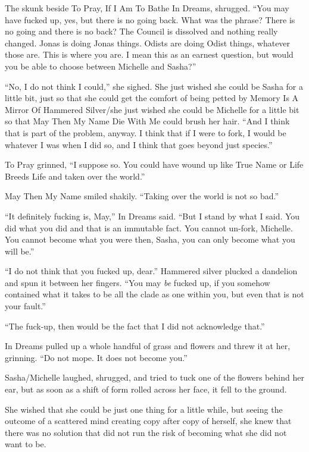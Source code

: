 The skunk beside To Pray, If I Am To Bathe In Dreams, shrugged. ``You may have fucked up, yes, but there is no going back. What was the phrase? There is no going and there is no back? The Council is dissolved and nothing really changed. Jonas is doing Jonas things. Odists are doing Odist things, whatever those are. This is where you are. I mean this as an earnest question, but would you be able to choose between Michelle and Sasha?''

``No, I do not think I could,'' she sighed. She just wished she could be Sasha for a little bit, just so that she could get the comfort of being petted by Memory Is A Mirror Of Hammered Silver/she just wished she could be Michelle for a little bit so that May Then My Name Die With Me could brush her hair. ``And I think that is part of the problem, anyway. I think that if I were to fork, I would be whatever I was when I did so, and I think that goes beyond just species.''

To Pray grinned, ``I suppose so. You could have wound up like True Name or Life Breeds Life and taken over the world.''

May Then My Name smiled shakily. ``Taking over the world is not so bad.''

``It definitely fucking is, May,'' In Dreams said. ``But I stand by what I said. You did what you did and that is an immutable fact. You cannot un-fork, Michelle. You cannot become what you were then, Sasha, you can only become what you will be.''

``I do not think that you fucked up, dear.'' Hammered silver plucked a dandelion and spun it between her fingers. ``You may \emph{be} fucked up, if you somehow contained what it takes to be all the clade as one within you, but even that is not your fault.''

``The fuck-up, then would be the fact that I did not acknowledge that.''

In Dreams pulled up a whole handful of grass and flowers and threw it at her, grinning. ``Do not mope. It does not become you.''

Sasha/Michelle laughed, shrugged, and tried to tuck one of the flowers behind her ear, but as soon as a shift of form rolled across her face, it fell to the ground.

She wished that she could be just one thing for a little while, but seeing the outcome of a scattered mind creating copy after copy of herself, she knew that there was no solution that did not run the risk of becoming what she did not want to be.

